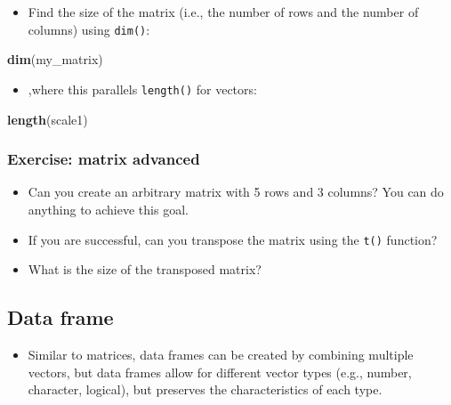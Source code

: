 \documentclass[
]{book}
\newenvironment{Shaded}{\begin{snugshade}}{\end{snugshade}}
\newcommand{\FunctionTok}[1]{\textcolor[rgb]{0.13,0.29,0.53}{\textbf{#1}}}
\newcommand{\NormalTok}[1]{#1}
\providecommand{\tightlist}{%
  \setlength{\itemsep}{0pt}\setlength{\parskip}{0pt}}
\begin{document}
\begin{itemize}
\tightlist
\item
  Find the size of the matrix (i.e., the number of rows and the number of columns) using \texttt{dim()}:
\end{itemize}

\begin{Shaded}
\begin{Highlighting}[]
\FunctionTok{dim}\NormalTok{(my\_matrix)}
\end{Highlighting}
\end{Shaded}

\begin{itemize}
\tightlist
\item
  ,where this parallels \texttt{length()} for vectors:
\end{itemize}

\begin{Shaded}
\begin{Highlighting}[]
\FunctionTok{length}\NormalTok{(scale1)}
\end{Highlighting}
\end{Shaded}

\subsubsection{Exercise: matrix advanced}\label{exercise-matrix-advanced}

\begin{itemize}
\item
  Can you create an arbitrary matrix with 5 rows and 3 columns? You can do anything to achieve this goal.
\item
  If you are successful, can you transpose the matrix using the \texttt{t()} function?
\item
  What is the size of the transposed matrix?
\end{itemize}

\subsection{Data frame}\label{data-frame}

\begin{itemize}
\tightlist
\item
  Similar to matrices, data frames can be created by combining multiple vectors, but data frames allow for different vector types (e.g., number, character, logical), but preserves the characteristics of each type.
\end{itemize}
\end{document}
